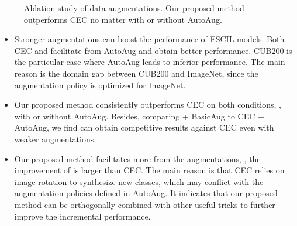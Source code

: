 \begin{figure}[t]
	\begin{center}
	\end{center}
\caption{Ablation study of data augmentations. Our proposed method outperforms CEC no matter with or without AutoAug.
	} \label{figure:augmentation_ablation}
\end{figure}


	\begin{itemize}
	\item Stronger augmentations can boost the performance of FSCIL models. Both CEC and \name facilitate from AutoAug and obtain better performance. CUB200 is the particular case where AutoAug leads to inferior performance. The main reason is the domain gap between CUB200 and ImageNet, since the augmentation policy is optimized for ImageNet.
	\item Our proposed method consistently outperforms CEC on both conditions, \ie, with or without AutoAug. Besides, comparing \name + BasicAug to CEC + AutoAug, we find \name can obtain competitive results against CEC even with weaker augmentations.	
\item Our proposed method facilitates more from the augmentations, \ie, the improvement of \name is larger than CEC. 
The main reason is that CEC relies on image rotation to synthesize new classes, which may conflict with the augmentation policies defined in AutoAug.
It indicates that our proposed method can be orthogonally combined with other useful tricks to further improve the incremental performance.
\end{itemize}
